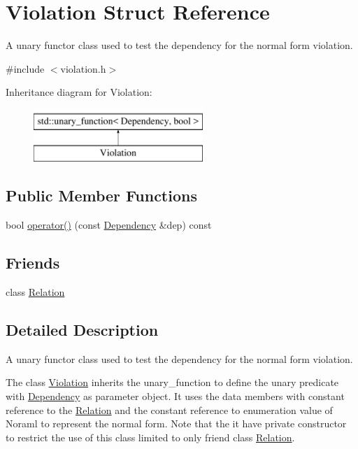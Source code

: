 \hypertarget{struct_violation}{}\section{Violation Struct Reference}
\label{struct_violation}


A unary functor class used to test the dependency for the normal form violation.  




{\ttfamily \#include $<$violation.\+h$>$}

Inheritance diagram for Violation\+:\begin{figure}[H]
\begin{center}
\leavevmode
\includegraphics[height=2.000000cm]{struct_violation}
\end{center}
\end{figure}
\subsection*{Public Member Functions}
\begin{DoxyCompactItemize}
\item 
bool \hyperlink{struct_violation_a63407337fcf0ca1a699ee371504533d7}{operator()} (const \hyperlink{class_dependency}{Dependency} \&dep) const 
\end{DoxyCompactItemize}
\subsection*{Friends}
\begin{DoxyCompactItemize}
\item 
class \hyperlink{struct_violation_a7ee004262f27f8c916688911a71e3aa1}{Relation}
\end{DoxyCompactItemize}


\subsection{Detailed Description}
A unary functor class used to test the dependency for the normal form violation. 

The class \hyperlink{struct_violation}{Violation} inherits the unary\+\_\+function to define the unary predicate with \hyperlink{class_dependency}{Dependency} as parameter object. It uses the data members with constant reference to the \hyperlink{class_relation}{Relation} and the constant reference to enumeration value of Noraml to represent the normal form. Note that the it have private constructor to restrict the use of this class limited to only friend class \hyperlink{class_relation}{Relation}. 

